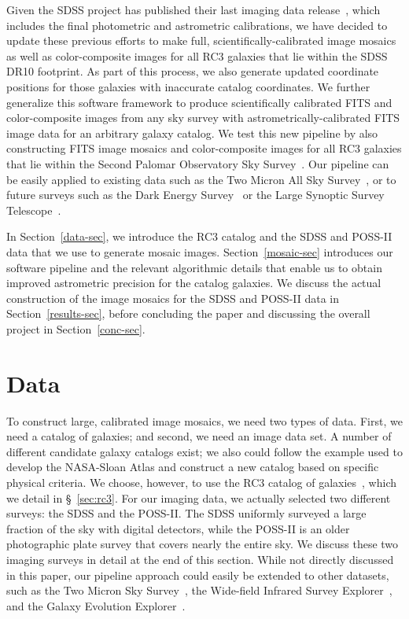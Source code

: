 \documentclass[authoryear, 12pt, 5p, times]{elsarticle}
\begin{document}
Given the SDSS project has published their last imaging data release~\citep[DR10; ][]{dr10}, which includes the final photometric and astrometric calibrations, we have decided to update these previous efforts to make full, scientifically-calibrated image mosaics as well as color-composite images for all RC3 galaxies that lie within the SDSS DR10 footprint. As part of this process, we also generate updated coordinate positions for those galaxies with inaccurate catalog coordinates. We further generalize this software framework to produce scientifically calibrated FITS and color-composite images from any sky survey with astrometrically-calibrated FITS image data for an arbitrary galaxy catalog. We test this new pipeline by also constructing FITS image mosaics and color-composite images for all RC3 galaxies that lie within the Second Palomar Observatory Sky Survey~\citep[POSS-II;][]{poss2}. Our pipeline can be easily applied to existing data such as the Two Micron All Sky Survey~\citep[2MASS;][]{2mass}, or to future surveys such as the Dark Energy Survey~\citep[DES;][]{des} or the Large Synoptic Survey Telescope~\citep[LSST;][]{lsst}.

In Section~\ref{data-sec}, we introduce the RC3 catalog and the SDSS and POSS-II data that we use to generate mosaic images. Section~\ref{mosaic-sec} introduces our software pipeline and the relevant algorithmic details that enable us to obtain improved astrometric precision for the catalog galaxies. We discuss the actual construction of the image mosaics for the SDSS and POSS-II data in Section~\ref{results-sec}, before concluding the paper and discussing the overall project in Section~\ref{conc-sec}. 

\section{Data\label{data-sec}}

To construct large, calibrated image mosaics, we need two types of data. First, we need a catalog of galaxies; and second, we need an image data set. A number of different candidate galaxy catalogs exist; we also could follow the example used to develop the NASA-Sloan Atlas and construct a new catalog based on specific physical criteria. We choose, however, to use the RC3 catalog of galaxies~\citep{rc3}, which we detail in \S~\ref{sec:rc3}. For our imaging data, we actually selected two different surveys: the SDSS and the POSS-II. The SDSS uniformly surveyed a large fraction of the sky with digital detectors, while the POSS-II is an older photographic plate survey that covers nearly the entire sky. We discuss these two imaging surveys in detail at the end of this section. While not directly discussed in this paper, our pipeline approach could easily be extended to other datasets, such as the Two Micron Sky Survey~\citep{2mass}, the Wide-field Infrared Survey Explorer~\citep{wise}, and the Galaxy Evolution Explorer~\citep{galex}.
\end{document}
